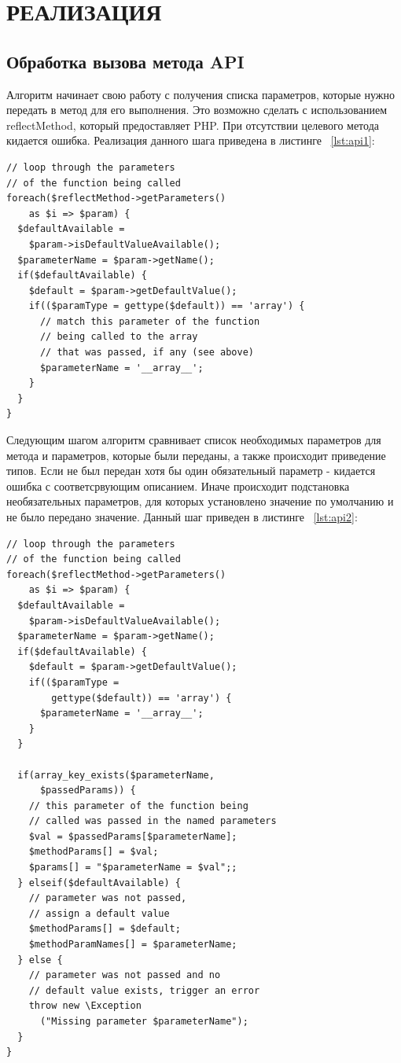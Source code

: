 \section{РЕАЛИЗАЦИЯ}

\subsection{Обработка вызова метода API}

Алгоритм начинает свою работу с получения списка параметров, которые нужно передать в метод для его выполнения. Это возможно сделать с использованием reflectMethod, который предоставляет PHP. При отсутствии целевого метода кидается ошибка. Реализация данного шага приведена в листинге ~\ref{lst:api1}:


\begin{lstlisting}[caption={Код получения списка параметров, необходимых для передачи в метод API}, label=lst:api1]
// loop through the parameters 
// of the function being called
foreach($reflectMethod->getParameters() 
    as $i => $param) {
  $defaultAvailable = 
    $param->isDefaultValueAvailable();
  $parameterName = $param->getName();
  if($defaultAvailable) {
    $default = $param->getDefaultValue();
    if(($paramType = gettype($default)) == 'array') {
      // match this parameter of the function 
      // being called to the array
      // that was passed, if any (see above)
      $parameterName = '__array__';
    }
  }
}
\end{lstlisting}

Следующим шагом алгоритм сравнивает список необходимых параметров для метода и параметров, которые были переданы, а также происходит приведение типов. Если не был передан хотя бы один обязательный параметр - кидается ошибка с соответсрвующим описанием. Иначе происходит подстановка необязательных параметров, для которых установлено значение по умолчанию и не было передано значение.
Данный шаг приведен в листинге ~\ref{lst:api2}:

\begin{lstlisting}[caption={Код сравнения типов параметров}, label=lst:api2]
// loop through the parameters 
// of the function being called
foreach($reflectMethod->getParameters() 
    as $i => $param) {
  $defaultAvailable = 
    $param->isDefaultValueAvailable();
  $parameterName = $param->getName();
  if($defaultAvailable) {
    $default = $param->getDefaultValue();
    if(($paramType = 
        gettype($default)) == 'array') {
      $parameterName = '__array__';
    }
  }

  if(array_key_exists($parameterName, 
      $passedParams)) {
    // this parameter of the function being 
    // called was passed in the named parameters
    $val = $passedParams[$parameterName];
    $methodParams[] = $val;
    $params[] = "$parameterName = $val";;
  } elseif($defaultAvailable) {
    // parameter was not passed, 
    // assign a default value
    $methodParams[] = $default;
    $methodParamNames[] = $parameterName;
  } else {
    // parameter was not passed and no 
    // default value exists, trigger an error
    throw new \Exception
      ("Missing parameter $parameterName");
  }
}
\end{lstlisting}

